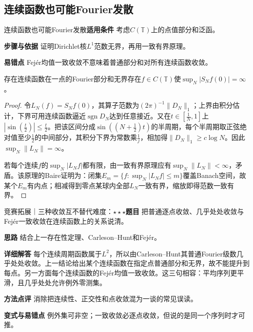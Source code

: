 \subsection{连续函数也可能Fourier发散}\label{deep:fourier_source_deep:continuousdivergence}

\begin{method}{连续函数也可能Fourier发散}\textbf{适用条件} 考虑$C(\mathbb T)$上的点值部分和泛函。\par\textbf{步骤与依据} 证明Dirichlet核$L^1$范数无界，再用一致有界原理。\par\textbf{易错点} Fejér均值一致收敛不意味着普通部分和对所有连续函数收敛。\end{method}

\begin{theorem}{存在连续函数在一点的Fourier部分和无界}存在$f\in C(\mathbb T)$使$\sup_N|S_Nf(0)|=\infty$。\end{theorem}\begin{proof}令$L_N(f)=S_Nf(0)$，其算子范数为$(2\pi)^{-1}\|D_N\|_1$；上界由积分估计，下界可用连续函数逼近$\operatorname{sgn}D_N$达到任意接近。又在$t\in[\frac{1}{N},1]$上$|\sin(\frac{t}{2})|\le \frac{t}{2}$。把该区间分成$\sin((N+\frac{1}{2})t)$的半周期，每个半周期取正弦绝对值至少$\frac{1}{2}$的中间部分，其积分下界为常数乘$\frac{1}{j}$，相加得$\|D_N\|_1\ge c\log N$。因此$\sup_N\|L_N\|=\infty$。\par 若每个连续$f$的$\sup_N|L_Nf|$都有限，由一致有界原理应有$\sup_N\|L_N\|<\infty$，矛盾。该原理的Baire证明为：闭集$E_m=\{f:\sup_N|L_Nf|\le m\}$覆盖Banach空间，故某个$E_m$有内点；相减得到零点某球内全部$L_N$一致有界，缩放即得范数一致有界。\end{proof}

\begin{example}{竞赛拓展｜三种收敛互不替代}{难度：$\star\star\star$}\label{deep:ex:fourier_source_deep:threelimits}\textbf{题目} 把普通逐点收敛、几乎处处收敛与Fejér一致收敛在连续函数上的关系说清。\par\textbf{思路} 结合上一存在性定理、Carleson--Hunt和Fejér。\par\textbf{详细解答} 每个连续周期函数属于$L^2$，所以由Carleson--Hunt其普通Fourier级数几乎处处收敛。上一结论给出某个连续函数在指定点普通部分和无界，故不能提升到每点。另一方面每个连续函数的Fejér均值一致收敛。这三句相容：平均序列更平滑，且几乎处处允许例外零测集。\par\textbf{方法点评} 消除把连续性、正交性和点收敛混为一谈的常见误读。\par\textbf{变式与易错点} 例外集可非空；一致收敛必逐点收敛，但说的是同一个序列时才可推。\end{example}

